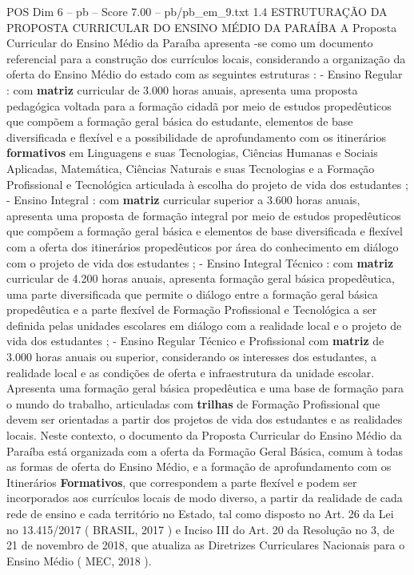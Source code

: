 \begin{textsample}{POS Dim 6 – pb – Score 7.00 – pb/pb\_em\_9.txt}  \label{ex:f6_pos_210}
1.4 ESTRUTURAÇÃO DA PROPOSTA CURRICULAR DO ENSINO MÉDIO DA PARAÍBA A Proposta Curricular do Ensino Médio da Paraíba apresenta -se como um documento referencial para a construção dos currículos locais, considerando a organização da oferta do Ensino Médio do estado com as seguintes estruturas : - Ensino Regular : com \textbf{matriz} curricular de 3.000 horas anuais, apresenta uma proposta pedagógica voltada para a formação cidadã por meio de estudos propedêuticos que compõem a formação geral básica do estudante, elementos de base diversificada e flexível e a possibilidade de aprofundamento com os itinerários \textbf{formativos} em Linguagens e suas Tecnologias, Ciências Humanas e Sociais Aplicadas, Matemática, Ciências Naturais e suas Tecnologias e a Formação Profissional e Tecnológica articulada à escolha do projeto de vida dos estudantes ; - Ensino Integral : com \textbf{matriz} curricular superior a 3.600 horas anuais, apresenta uma proposta de formação integral por meio de estudos propedêuticos que compõem a formação geral básica e elementos de base diversificada e flexível com a oferta dos itinerários propedêuticos por área do conhecimento em diálogo com o projeto de vida dos estudantes ; - Ensino Integral Técnico : com \textbf{matriz} curricular de 4.200 horas anuais, apresenta formação geral básica propedêutica, uma parte diversificada que permite o diálogo entre a formação geral básica propedêutica e a parte flexível de Formação Profissional e Tecnológica a ser definida pelas unidades escolares em diálogo com a realidade local e o projeto de vida dos estudantes ; - Ensino Regular Técnico e Profissional com \textbf{matriz} de 3.000 horas anuais ou superior, considerando os interesses dos estudantes, a realidade local e as condições de oferta e infraestrutura da unidade escolar.
Apresenta uma formação geral básica propedêutica e uma base de formação para o mundo do trabalho, articuladas com \textbf{trilhas} de Formação Profissional que devem ser orientadas a partir dos projetos de vida dos estudantes e as realidades locais.
Neste contexto, o documento da Proposta Curricular do Ensino Médio da Paraíba está organizada com a oferta da Formação Geral Básica, comum à todas as formas de oferta do Ensino Médio, e a formação de aprofundamento com os Itinerários \textbf{Formativos}, que correspondem a parte flexível e podem ser incorporados aos currículos locais de modo diverso, a partir da realidade de cada rede de ensino e cada território no Estado, tal como disposto no Art. 26 da Lei no 13.415/2017 ( BRASIL, 2017 ) e Inciso III do Art. 20 da Resolução no 3, de 21 de novembro de 2018, que atualiza as Diretrizes Curriculares Nacionais para o Ensino Médio ( MEC, 2018 ).

\end{textsample}

